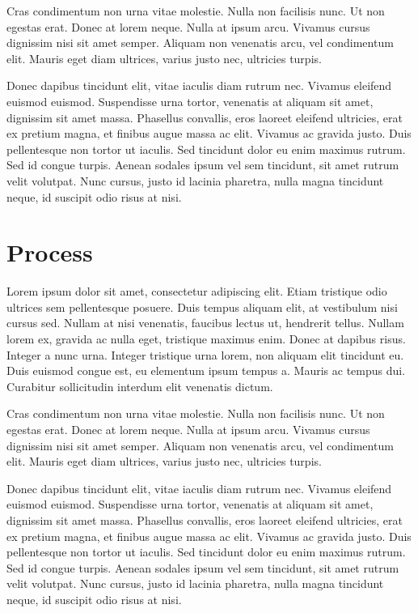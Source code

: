 \documentclass[11pt, a4paper]{resources/JTH}
\begin{document}
Cras condimentum non urna vitae molestie. Nulla non facilisis nunc. Ut non egestas erat. Donec at lorem neque. Nulla at ipsum arcu. Vivamus cursus dignissim nisi sit amet semper. Aliquam non venenatis arcu, vel condimentum elit. Mauris eget diam ultrices, varius justo nec, ultricies turpis.

Donec dapibus tincidunt elit, vitae iaculis diam rutrum nec. Vivamus eleifend euismod euismod. Suspendisse urna tortor, venenatis at aliquam sit amet, dignissim sit amet massa. Phasellus convallis, eros laoreet eleifend ultricies, erat ex pretium magna, et finibus augue massa ac elit. Vivamus ac gravida justo. Duis pellentesque non tortor ut iaculis. Sed tincidunt dolor eu enim maximus rutrum. Sed id congue turpis. Aenean sodales ipsum vel sem tincidunt, sit amet rutrum velit volutpat. Nunc cursus, justo id lacinia pharetra, nulla magna tincidunt neque, id suscipit odio risus at nisi.

\section{Process}

Lorem ipsum dolor sit amet, consectetur adipiscing elit. Etiam tristique odio ultrices sem pellentesque posuere. Duis tempus aliquam elit, at vestibulum nisi cursus sed. Nullam at nisi venenatis, faucibus lectus ut, hendrerit tellus. Nullam lorem ex, gravida ac nulla eget, tristique maximus enim. Donec at dapibus risus. Integer a nunc urna. Integer tristique urna lorem, non aliquam elit tincidunt eu. Duis euismod congue est, eu elementum ipsum tempus a. Mauris ac tempus dui. Curabitur sollicitudin interdum elit venenatis dictum.

Cras condimentum non urna vitae molestie. Nulla non facilisis nunc. Ut non egestas erat. Donec at lorem neque. Nulla at ipsum arcu. Vivamus cursus dignissim nisi sit amet semper. Aliquam non venenatis arcu, vel condimentum elit. Mauris eget diam ultrices, varius justo nec, ultricies turpis.

Donec dapibus tincidunt elit, vitae iaculis diam rutrum nec. Vivamus eleifend euismod euismod. Suspendisse urna tortor, venenatis at aliquam sit amet, dignissim sit amet massa. Phasellus convallis, eros laoreet eleifend ultricies, erat ex pretium magna, et finibus augue massa ac elit. Vivamus ac gravida justo. Duis pellentesque non tortor ut iaculis. Sed tincidunt dolor eu enim maximus rutrum. Sed id congue turpis. Aenean sodales ipsum vel sem tincidunt, sit amet rutrum velit volutpat. Nunc cursus, justo id lacinia pharetra, nulla magna tincidunt neque, id suscipit odio risus at nisi.
\end{document}
